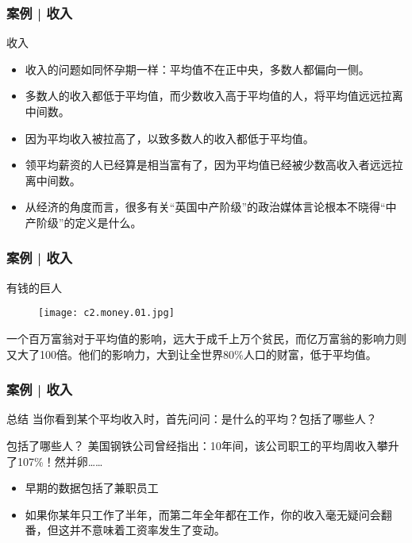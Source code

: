 \begin{frame}
  \frametitle{案例 | 收入}
  \begin{block}{收入}
    \begin{itemize}
      \item 收入的问题如同怀孕期一样：平均值不在正中央，多数人都偏向一侧。
      \item 多数人的收入都低于平均值，而少数收入高于平均值的人，将平均值远远拉离中间数。
      \item 因为平均收入被拉高了，以致多数人的收入都低于平均值。
      \item 领平均薪资的人已经算是相当富有了，因为平均值已经被少数高收入者远远拉离中间数。
      \item 从经济的角度而言，很多有关“英国中产阶级”的政治媒体言论根本不晓得“中产阶级”的定义是什么。
    \end{itemize}
  \end{block}
\end{frame}

\begin{frame}
  \frametitle{案例 | 收入}
  \begin{block}{有钱的巨人}
  \begin{figure}
    \centering
    \texttt{[image: c2.money.01.jpg]}
  \end{figure}
  一个百万富翁对于平均值的影响，远大于成千上万个贫民，而亿万富翁的影响力则又大了100倍。他们的影响力，大到让全世界80\%人口的财富，低于平均值。
  \end{block}
\end{frame}

\begin{frame}
  \frametitle{案例 | 收入}
  \begin{block}{总结}
    当你看到某个平均收入时，首先问问：是什么的平均？包括了哪些人？
  \end{block}
  \pause
  \begin{block}{包括了哪些人？}
    美国钢铁公司曾经指出：10年间，该公司职工的平均周收入攀升了107\%！然并卵……
    \begin{itemize}
      \item 早期的数据包括了兼职员工
      \item 如果你某年只工作了半年，而第二年全年都在工作，你的收入毫无疑问会翻番，但这并不意味着工资率发生了变动。
    \end{itemize}
  \end{block}
\end{frame}

